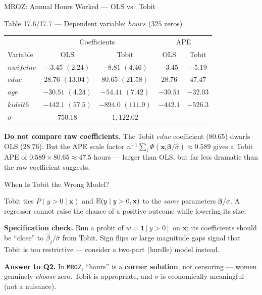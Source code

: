 \documentclass[aspectratio=169, 12pt]{beamer}
\newcommand{\xib}{\mathbf{x}_i\boldsymbol{\beta}}    %
\begin{document}
\begin{frame}[shrink=8]{MROZ: Annual Hours Worked --- OLS vs.\ Tobit}

  \begin{examplebox}{Table 17.6/17.7 --- Dependent variable: $hours$ ($325$ zeros)}
    \centering\footnotesize
    \begin{tabular}{l c c c c}
      \toprule
       & \multicolumn{2}{c}{Coefficients} & \multicolumn{2}{c}{APE} \\
      Variable & OLS & Tobit & OLS & Tobit \\
      \midrule
      $nwifeinc$ & $-3.45$ $(2.24)$ & $-8.81$ $(4.46)$ & $-3.45$ & $-5.19$ \\
      $educ$     & $28.76$ $(13.04)$ & $80.65$ $(21.58)$ & $28.76$ & $47.47$ \\
      $age$      & $-30.51$ $(4.24)$ & $-54.41$ $(7.42)$ & $-30.51$ & $-32.03$ \\
      $kidslt6$  & $-442.1$ $(57.5)$ & $-894.0$ $(111.9)$ & $-442.1$ & $-526.3$ \\
      \midrule
      $\hat\sigma$ & $750.18$ & $1{,}122.02$ & & \\
      \bottomrule
    \end{tabular}
  \end{examplebox}

  \begin{keybox}
    \small
    \textbf{Do not compare raw coefficients.} The Tobit $educ$ coefficient
    ($80.65$) dwarfs OLS ($28.76$). But the APE scale factor
    $n^{-1}\sum_i\Phi(\xib/\hat\sigma)\approx 0.589$ gives a Tobit APE of
    $0.589\times 80.65 \approx 47.5$ hours --- larger than OLS, but far less
    dramatic than the raw coefficient suggests.
  \end{keybox}

\end{frame}

\begin{frame}[shrink=8]{When Is Tobit the Wrong Model?}

  \begin{highlightbox}
    Tobit ties $P(y>0\mid\mathbf{x})$ and $\operatorname{\mathbb{E}}(y\mid y>0,\mathbf{x})$ to the
    \emph{same} parameters $\boldsymbol\beta/\sigma$. A regressor cannot raise the
    chance of a positive outcome while lowering its size.
  \end{highlightbox}

  \smallskip

  \begin{keybox}
    \textbf{Specification check.} Run a probit of $w=\mathbf{1}[y>0]$ on
    $\mathbf{x}$; its coefficients should be ``close'' to $\hat\beta_j/\hat\sigma$
    from Tobit. Sign flips or large magnitude gaps signal that Tobit is too
    restrictive --- consider a two-part (hurdle) model instead.

    \smallskip
    \textbf{Answer to Q2.} In \texttt{MROZ}, ``hours'' is a \textbf{corner
    solution}, not censoring --- women genuinely \emph{choose} zero. Tobit is
    appropriate, and $\sigma$ is economically meaningful (not a nuisance).
  \end{keybox}

\end{frame}
\end{document}
